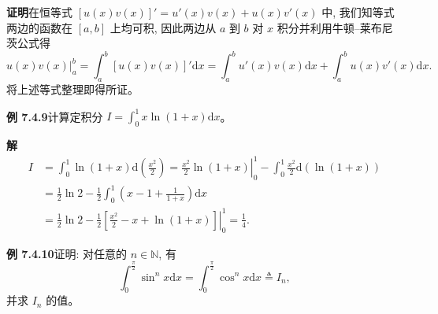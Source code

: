 \documentclass[UTF8, 12pt, fontset=fandol, oneside]{ctexart}
\begin{document}
\noindent\textbf{证明}\quad 在恒等式 $[u(x)v(x)]'=u'(x)v(x)+u(x)v'(x)$ 中, 我们知等式两边的函数在 $[a,b]$ 上均可积, 因此两边从 $a$ 到 $b$ 对 $x$ 积分并利用牛顿--莱布尼茨公式得
\[
  \left.u(x)v(x)\right|_a^b
  =\int_a^b [u(x)v(x)]'\mathrm dx
  =\int_a^b u'(x)v(x)\mathrm dx+\int_a^b u(x)v'(x)\mathrm dx.
\]
将上述等式整理即得所证。

\noindent\textbf{例 7.4.9}\quad 计算定积分 $I=\int_0^1 x\ln(1+x)\mathrm dx$。

\noindent\textbf{解}\quad
\[
\begin{aligned}
  I&=\int_0^1 \ln(1+x)\mathrm d\left(\frac{x^2}{2}\right)
  =\left.\frac{x^2}{2}\ln(1+x)\right|_0^1
  -\int_0^1 \frac{x^2}{2}\mathrm d(\ln(1+x))\\
  &=\frac{1}{2}\ln2-\frac{1}{2}\int_0^1\left(x-1+\frac{1}{1+x}\right)\mathrm dx\\
  &=\frac{1}{2}\ln2-\frac{1}{2}\left.\left[\frac{x^2}{2}-x+\ln(1+x)\right]\right|_0^1
  =\frac{1}{4}.
\end{aligned}
\]

\noindent\textbf{例 7.4.10}\quad 证明: 对任意的 $n\in\mathbb N$, 有
\[
  \int_0^{\frac{\pi}{2}}\sin^n x\mathrm dx
  =\int_0^{\frac{\pi}{2}}\cos^n x\mathrm dx\triangleq I_n,
\]
并求 $I_n$ 的值。
\end{document}
